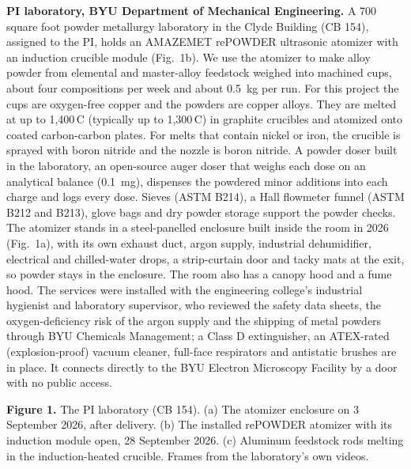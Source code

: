 \textbf{PI laboratory, BYU Department of Mechanical Engineering.} A 700
square foot powder metallurgy laboratory in the Clyde Building (CB 154),
assigned to the PI, holds an AMAZEMET rePOWDER ultrasonic atomizer with an
induction crucible module (Fig.~1b). We use the atomizer to make alloy powder
from elemental and master-alloy feedstock weighed into machined cups, about
four compositions per week and about 0.5~kg per run. For this project the
cups are oxygen-free copper and the powders are copper alloys. They are
melted at up to 1,400\,\textdegree{}C (typically up to
1,300\,\textdegree{}C) in graphite crucibles and atomized onto coated
carbon-carbon plates. For melts that contain nickel or iron, the crucible is
sprayed with boron nitride and the nozzle is boron nitride. A powder doser
built in the laboratory, an open-source auger doser that weighs each dose on
an analytical balance (0.1~mg), dispenses the powdered minor additions into
each charge and logs every dose. Sieves (ASTM B214), a Hall flowmeter funnel
(ASTM B212 and B213), glove bags and dry powder storage support the powder
checks. The atomizer stands in a steel-panelled enclosure built inside the
room in 2026 (Fig.~1a), with its own exhaust duct, argon supply, industrial
dehumidifier, electrical and chilled-water drops, a strip-curtain door and
tacky mats at the exit, so powder stays in the enclosure. The room also has
a canopy hood and a fume hood. The services were installed with the
engineering college's industrial hygienist and laboratory supervisor, who
reviewed the safety data sheets, the oxygen-deficiency risk of the argon
supply and the shipping of metal powders through BYU Chemicals Management;
a Class D extinguisher, an ATEX-rated (explosion-proof) vacuum cleaner,
full-face respirators and antistatic brushes are in place. It connects
directly to the BYU Electron Microscopy Facility by a door with no public
access.

\textbf{Figure 1.} The PI laboratory (CB 154). (a) The atomizer enclosure on
3 September 2026, after delivery. (b) The installed rePOWDER atomizer with
its induction module open, 28 September 2026. (c) Aluminum feedstock rods
melting in the induction-heated crucible. Frames from the laboratory's own
videos.

